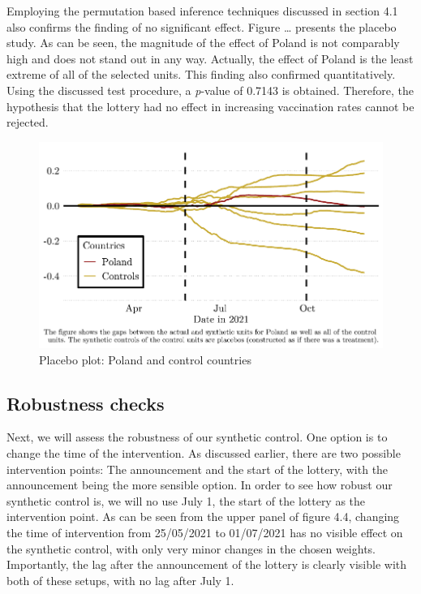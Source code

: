 \documentclass{scrbook}
\begin{document}
Employing the permutation based inference techniques discussed in
section 4.1 also confirms the finding of no significant effect. Figure
\ldots{} presents the placebo study. As can be seen, the magnitude of
the effect of Poland is not comparably high and does not stand out in
any way. Actually, the effect of Poland is the least extreme of all of
the selected units. This finding also confirmed quantitatively. Using
the discussed test procedure, a \textit{p}-value of 0.7143 is obtained.
Therefore, the hypothesis that the lottery had no effect in increasing
vaccination rates cannot be rejected.

\begin{figure}[h]
\caption{Placebo plot: Poland and control countries}

\begin{center}\includegraphics{bachelor_thesis_files/figure-latex/unnamed-chunk-4-1} \end{center}
\end{figure}

\subsection*{Robustness checks}

Next, we will assess the robustness of our synthetic control. One option
is to change the time of the intervention. As discussed earlier, there
are two possible intervention points: The announcement and the start of
the lottery, with the announcement being the more sensible option. In
order to see how robust our synthetic control is, we will no use July 1,
the start of the lottery as the intervention point. As can be seen from
the upper panel of figure 4.4, changing the time of intervention from
25/05/2021 to 01/07/2021 has no visible effect on the synthetic control,
with only very minor changes in the chosen weights. Importantly, the lag
after the announcement of the lottery is clearly visible with both of
these setups, with no lag after July 1.
\end{document}
